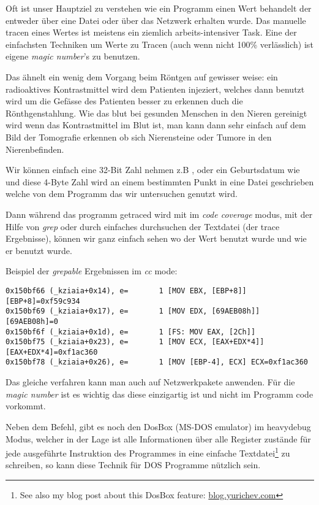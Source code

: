 
Oft ist unser Hauptziel zu verstehen wie ein Programm einen Wert behandelt der entweder \"uber eine Datei oder \"uber das Netzwerk erhalten wurde.
Das manuelle tracen eines Wertes ist meistens ein ziemlich arbeits-intensiver Task. Eine der einfachsten Techniken um Werte zu Tracen (auch wenn nicht 100\% verl\"asslich)
ist eigene \emph{magic number}'s zu benutzen. 

Das \"ahnelt ein wenig dem Vorgang beim R\"ontgen auf gewisser weise: ein radioaktives Kontrastmittel wird dem Patienten injeziert,
welches dann benutzt wird um die Gef\"asse des Patienten besser zu erkennen duch die R\"onthgenstahlung. Wie das blut bei 
gesunden Menschen in den Nieren gereinigt wird wenn das Kontrastmittel im Blut ist, man kann dann sehr einfach auf dem
Bild der Tomografie erkennen ob sich Nierensteine oder Tumore in den Nierenbefinden. 

Wir k\"onnen einfach eine 32-Bit Zahl nehmen z.B , oder ein Geburtsdatum wie 
und diese 4-Byte Zahl wird an einem bestimmten Punkt in eine Datei geschrieben welche von dem Programm 
das wir untersuchen genutzt wird. 

\myindex{\GrepUsage}

Dann w\"ahrend das programm getraced wird mit \tracer im \emph{code coverage} modus, mit der Hilfe von \emph{grep}
oder durch einfaches durchsuchen der Textdatei (der trace Ergebnisse), k\"onnen wir ganz einfach sehen wo der 
Wert benutzt wurde und wie er benutzt wurde. 

Beispiel der \emph{grepable} \tracer Ergebnissen im \emph{cc} mode:

\begin{lstlisting}[style=customasmx86]
0x150bf66 (_kziaia+0x14), e=       1 [MOV EBX, [EBP+8]] [EBP+8]=0xf59c934 
0x150bf69 (_kziaia+0x17), e=       1 [MOV EDX, [69AEB08h]] [69AEB08h]=0 
0x150bf6f (_kziaia+0x1d), e=       1 [FS: MOV EAX, [2Ch]] 
0x150bf75 (_kziaia+0x23), e=       1 [MOV ECX, [EAX+EDX*4]] [EAX+EDX*4]=0xf1ac360 
0x150bf78 (_kziaia+0x26), e=       1 [MOV [EBP-4], ECX] ECX=0xf1ac360 
\end{lstlisting}

Das gleiche verfahren kann man auch auf Netzwerkpakete anwenden.
F\"ur die \emph{magic number} ist es wichtig das diese einzigartig ist und nicht im Programm code vorkommt.

\newcommand{\DOSBOXURL}{\href{http://go.yurichev.com/17222}{blog.yurichev.com}}

Neben dem \tracer Befehl, gibt es noch den DosBox (MS-DOS emulator) im heavydebug Modus,
welcher in der Lage ist alle Informationen \"uber alle Register zust\"ande f\"ur jede ausgef\"uhrte Instruktion des Programmes in
eine einfache Textdatei\footnote{See also my blog post about this DosBox feature: \DOSBOXURL{}} zu schreiben, so kann
diese Technik f\"ur DOS Programme n\"utzlich sein. 

